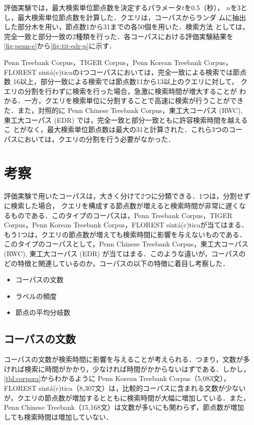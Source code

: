 \documentclass[japanese]{jnlp_1.3e}
\begin{document}
評価実験では，最大検索単位節点数を決定するパラメータ$t$を0.5（秒），
$n$を3とし，最大検索単位節点数を計算した．クエリは，コーパスからランダ
ムに抽出した部分木を用い，節点数1から31までの各50個を用いた．検索方法
としては，完全一致と部分一致の2種類を行った．各コーパスにおける評価実験結果を
\figurename\ref{fig:penn-e}から\figurename\ref{fig:tit-edr-p}に示す．



Penn Treebank Corpus，TIGER Corpus，Penn Korean Treebank Corpus，FLOREST sint\'{a}(c)ticaの4つコーパスにおいては，完全一致による検索では節点数
16以上，部分一致による検索では節点数11から13以上のクエリに対して，
クエリの分割を行わずに検索を行った場合，急激に検索時間が増大することが
わかる．一方，クエリを検索単位に分割することで高速に検索が行うことができ
た．また，対照的に Penn Chinese Treebank Corpus，東工大コーパス (RWC), 
東工大コーパス (EDR) では，完全一致と部分一致ともに許容検索時間を越えるこ
とがなく，最大検索単位節点数は最大の31と計算された．これら3つのコー
パスにおいては，クエリの分割を行う必要がなかった．



\section{考察}
\label{discussion}

評価実験で用いたコーパスは，大きく分けて2つに分類できる．1つは，分割せずに検索した場合，
クエリを構成する節点数が増えると検索時間が非常に遅くなるものである．このタイプのコーパスは，Penn Treebank Corpus，TIGER Corpus，Penn Korean Treebank Corpus，FLOREST sint\'{a}(c)ticaが当てはまる．もう1つは，クエリの節点数が増えても検索時間に影響を与えないものである．このタイプのコーパスとして，Penn Chinese Treebank Corpus，東工大コーパス (RWC), 東工大コーパス (EDR) が当てはまる．このような違いが，コーパスのどの特徴と関連しているのか，コーパスの以下の特徴に着目し考察した．

\begin{itemize}
\item コーパスの文数
\item ラベルの頻度
\item 節点の平均分岐数
\end{itemize}


\subsection{コーパスの文数}

コーパスの文数が検索時間に影響を与えることが考えられる．つまり，文数が多ければ検索に時間がかかり，少なければ時間がかからないはずである．しかし，\tablename\ref{tbl:corpora}からわかるように Penn Korean Treebank Corpus（5,083文），FLOREST sint\'{a}(c)tica（8,307文）は，比較的コーパスに含まれる文数が少ないが，クエリの節点数が増加するとともに検索時間が大幅に増加している．また，Penn Chinese Treebank（15,168文）は文数が多いにも関わらず，節点数が増加しても検索時間は増加していない．
\end{document}
